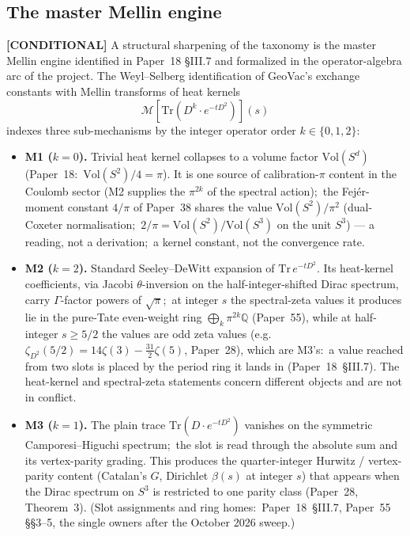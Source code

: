 \documentclass[aps,pra,twocolumn,superscriptaddress,longbibliography]{revtex4-2}
\newcommand{\gvc}[2]{#2}
\begin{document}
\subsection*{The master Mellin engine}

\textbf{[CONDITIONAL]} A structural sharpening of the taxonomy is the master Mellin engine
identified in Paper~18 \S{}III.7 and formalized in the operator-algebra
arc of the project.  The Weyl--Selberg identification of GeoVac's
exchange constants with Mellin transforms of heat kernels
\begin{equation}
\mathcal{M}\!\left[ \mathrm{Tr}\left( D^k \cdot e^{-t D^2} \right) \right](s)
\end{equation}
indexes three sub-mechanisms by the integer operator order
$k \in \{0, 1, 2\}$:

\begin{itemize}
\item \textbf{M1 ($k = 0$).}  Trivial heat kernel collapses to a
volume factor $\text{Vol}(S^d)$ (Paper~18:\ $\text{Vol}(S^2)/4 = \pi$).  It is one
source of calibration-$\pi$ content in the Coulomb sector (M2
supplies the $\pi^{2k}$ of the spectral action);\ the Fej\'er-moment
constant $4/\pi$ of Paper~38 shares the value $\text{Vol}(S^2)/\pi^2$
(dual-Coxeter normalisation;\ $2/\pi = \text{Vol}(S^2)/\text{Vol}(S^3)$ on the unit $S^3$) ---
a reading, not a derivation;\ a kernel constant, not the convergence rate.

\item \textbf{M2 ($k = 2$).}  Standard Seeley--DeWitt expansion of
$\mathrm{Tr}\,e^{-t D^2}$.  Its heat-kernel coefficients, via Jacobi
$\theta$-inversion on the half-integer-shifted Dirac spectrum, carry
$\Gamma$-factor powers of $\sqrt{\pi}$;\ \gvc{m2-ring-integer-s}{at integer $s$ the
spectral-zeta values it produces lie in the pure-Tate even-weight ring
$\bigoplus_k \pi^{2k}\mathbb{Q}$ (Paper~55)}, while at half-integer
$s \ge 5/2$ the values are odd zeta values (e.g.\
$\zeta_{D^2}(5/2) = 14\zeta(3) - \tfrac{31}{2}\zeta(5)$, Paper~28),
which are M3's:\ a value reached from two slots is placed by the period
ring it lands in (Paper~18~\S III.7).  The heat-kernel and spectral-zeta statements concern
different objects and are not in conflict.

\item \textbf{M3 ($k = 1$).}  The plain trace
$\mathrm{Tr}(D \cdot e^{-t D^2})$ vanishes on the symmetric
Camporesi--Higuchi spectrum;\ the slot is read through the absolute
sum and its vertex-parity grading.  This produces the quarter-integer
Hurwitz / vertex-parity content (Catalan's $G$, Dirichlet $\beta(s)$ at
integer $s$) that appears when the Dirac spectrum on $S^3$ is
restricted to one parity class (Paper~28, Theorem~3).
(Slot assignments and ring homes:\ Paper~18~\S III.7, Paper~55
\S\S 3--5, the single owners after the October 2026 sweep.)
\end{itemize}
\end{document}
